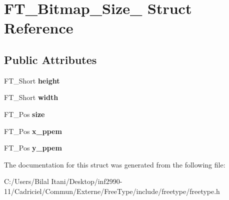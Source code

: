 \hypertarget{struct_f_t___bitmap___size__}{}\section{F\+T\+\_\+\+Bitmap\+\_\+\+Size\+\_\+ Struct Reference}
\label{struct_f_t___bitmap___size__}
\subsection*{Public Attributes}
\begin{DoxyCompactItemize}
\item 
F\+T\+\_\+\+Short {\bfseries height}\hypertarget{struct_f_t___bitmap___size___adf2f24039b458ff4674712886f242262}{}\label{struct_f_t___bitmap___size___adf2f24039b458ff4674712886f242262}

\item 
F\+T\+\_\+\+Short {\bfseries width}\hypertarget{struct_f_t___bitmap___size___ab9da94223f75a89a649d1e6d018b17f1}{}\label{struct_f_t___bitmap___size___ab9da94223f75a89a649d1e6d018b17f1}

\item 
F\+T\+\_\+\+Pos {\bfseries size}\hypertarget{struct_f_t___bitmap___size___a1db23a6220fb6bcb712430821a6e5352}{}\label{struct_f_t___bitmap___size___a1db23a6220fb6bcb712430821a6e5352}

\item 
F\+T\+\_\+\+Pos {\bfseries x\+\_\+ppem}\hypertarget{struct_f_t___bitmap___size___a6f877a792d2dc93328037c928979215f}{}\label{struct_f_t___bitmap___size___a6f877a792d2dc93328037c928979215f}

\item 
F\+T\+\_\+\+Pos {\bfseries y\+\_\+ppem}\hypertarget{struct_f_t___bitmap___size___a60d4d003d09fd57505f69f39e31e19c1}{}\label{struct_f_t___bitmap___size___a60d4d003d09fd57505f69f39e31e19c1}

\end{DoxyCompactItemize}


The documentation for this struct was generated from the following file\+:\begin{DoxyCompactItemize}
\item 
C\+:/\+Users/\+Bilal Itani/\+Desktop/inf2990-\/11/\+Cadriciel/\+Commun/\+Externe/\+Free\+Type/include/freetype/freetype.\+h\end{DoxyCompactItemize}
